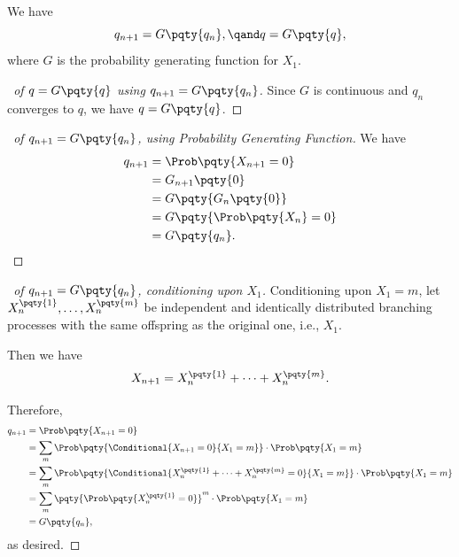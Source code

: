 \begin{proposition}
    We have
    \[
        q_{n + 1} = G\pqty{q_n}, \qand q = G\pqty{q},
    \]
    where \(G\) is the probability generating function for \(X_1\).
\end{proposition}

\begin{proof}[\proofname\ of \(q = G\pqty{q}\) using \(q_{n + 1} = G\pqty{q_n}\)]
    Since \(G\) is continuous and \(q_n\) converges to \(q\), we have \(q = G\pqty{q}\).
\end{proof}

\begin{proof}[\proofname\ of \(q_{n + 1} = G\pqty{q_n}\), using Probability Generating Function]
    We have
    \begin{align*}
        q_{n + 1} &= \Prob\pqty{X_{n + 1} = 0} \\
        &= G_{n + 1}\pqty{0} \\
        &= G\pqty{G_{n} \pqty{0}} \\
        &= G\pqty{\Prob\pqty{X_n} = 0} \\
        &= G\pqty{q_n}.
    \end{align*}
\end{proof}

\begin{proof}[\proofname\ of \(q_{n + 1} = G\pqty{q_n}\), conditioning upon \(X_1\)]
    Conditioning upon \(X_1 = m\), let \(X_n^{\pqty{1}}, \ldots, X_n^{\pqty{m}}\) be independent and identically distributed branching processes with the same offspring as the original one, i.e., \(X_1\).

    Then we have
    \[
        X_{n + 1} = X_{n}^{\pqty{1}} + \cdots + X_n^{\pqty{m}}.
    \]

    Therefore,
    \begin{align*}
        q_{n + 1} &= \Prob\pqty{X_{n + 1} = 0} \\
        &= \sum_{m} \Prob\pqty{\Conditional{X_{n + 1} = 0}{X_1 = m}} \cdot \Prob\pqty{X_1 = m} \\
        &= \sum_{m} \Prob\pqty{\Conditional{X_n^{\pqty{1}} + \cdots + X_n^{\pqty{m}} = 0}{X_1 = m}} \cdot \Prob\pqty{X_1 = m} \\
        &= \sum_{m} \pqty{\Prob\pqty{X_n^{\pqty{1}} = 0}}^{m} \cdot \Prob\pqty{X_1 = m} \\
        &= G\pqty{q_n},
    \end{align*}
    as desired.
\end{proof}

